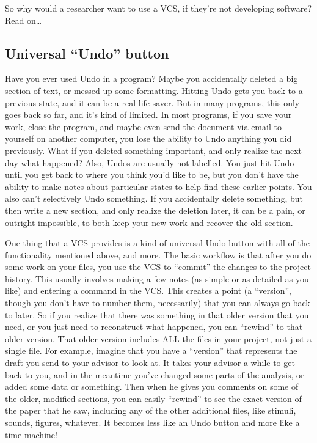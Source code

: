 \documentclass{article}
\begin{document}
So why would a researcher want to use a VCS, if they're not developing software?  Read on\ldots{}
\subsection{Universal ``Undo'' button}
\label{sec-2-2}

Have you ever used Undo in a program?  Maybe you accidentally deleted a big section of text, or messed up some formatting.  Hitting Undo gets you back to a previous state, and it can be a real life-saver.  But in many programs, this only goes back so far, and it's kind of limited.  In most programs, if you save your work, close the program, and maybe even send the document via email to yourself on another computer, you lose the ability to Undo anything you did previously. What if you deleted something important, and only realize the next day what happened?  Also, Undos are usually not labelled. You just hit Undo until you get back to where you think you'd like to be, but you don't have the ability to make notes about particular states to help find these earlier points.  You also can't selectively Undo something.  If you accidentally delete something, but then write a new section, and only realize the deletion later, it can be a pain, or outright impossible, to both keep your new work and recover the old section.

One thing that a VCS provides is a kind of universal Undo button with all of the functionality mentioned above, and more. The basic workflow is that after you do some work on your files, you use the VCS to ``commit'' the changes to the project history. This usually involves making a few notes (as simple or as detailed as you like) and entering a command in the VCS.  This creates a point (a ``version'', though you don't have to number them, necessarily) that you can always go back to later. So if you realize that there was something in that older version that you need, or you just need to reconstruct what happened, you can ``rewind'' to that older version.  That older version includes ALL the files in your project, not just a single file. For example, imagine that you have a ``version'' that represents the draft you send to your advisor to look at.  It takes your advisor a while to get back to you, and in the meantime you've changed some parts of the analysis, or added some data or something. Then when he gives you comments on some of the older, modified sections, you can easily ``rewind'' to see the exact version of the paper that he saw, including any of the other additional files, like stimuli, sounds, figures, whatever. It becomes less like an Undo button and more like a time machine!
\end{document}
